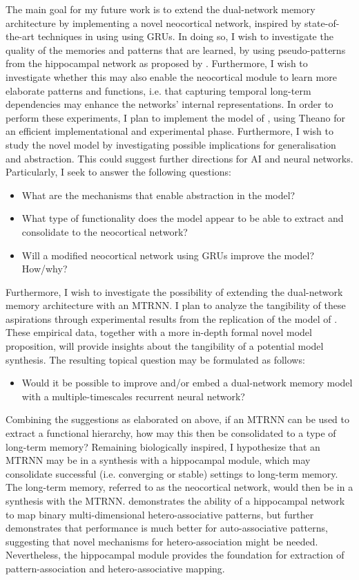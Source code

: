The main goal for my future work is to extend the dual-network memory architecture by implementing a novel neocortical network, inspired by state-of-the-art techniques in using using GRUs. In doing so, I wish to investigate the quality of the memories and patterns that are learned, by using pseudo-patterns from the hippocampal network as proposed by \cite{Hattori2014}. Furthermore, I wish to investigate whether this may also enable the neocortical module to learn more elaborate patterns and functions, i.e. that capturing temporal long-term dependencies may enhance the networks' internal representations.
In order to perform these experiments, I plan to implement the model of \cite{Hattori2014}, using Theano for an efficient implementational and experimental phase. Furthermore, I wish to study the novel model by investigating possible implications for generalisation and abstraction. This could suggest further directions for AI and neural networks. Particularly, I seek to answer the following questions:
\begin{itemize}
\item What are the mechanisms that enable abstraction in the model?
\item What type of functionality does the model appear to be able to extract and consolidate to the neocortical network?
\item Will a modified neocortical network using GRUs improve the model? How/why?
\end{itemize}

Furthermore, I wish to investigate the possibility of extending the dual-network memory architecture with an MTRNN. I plan to analyze the tangibility of these aspirations through experimental results from the replication of the model of \cite{Hattori2014}. These empirical data, together with a more in-depth formal novel model proposition, will provide insights about the tangibility of a potential model synthesis. The resulting topical question may be formulated as follows:
\begin{itemize}
\item Would it be possible to improve and/or embed a dual-network memory model with a multiple-timescales recurrent neural network?
\end{itemize}

Combining the suggestions as elaborated on above, if an MTRNN can be used to extract a functional hierarchy, how may this then be consolidated to a type of long-term memory? Remaining biologically inspired, I hypothesize that an MTRNN may be in a synthesis with a hippocampal module, which may consolidate successful (i.e. converging or stable) settings to long-term memory. The long-term memory, referred to as the neocortical network, would then be in a synthesis with the MTRNN.
\cite{Hattori2014} demonstrates the ability of a hippocampal network to map binary multi-dimensional hetero-associative patterns, but further demonstrates that performance is much better for auto-associative patterns, suggesting that novel mechanisms for hetero-association might be needed. Nevertheless, the hippocampal module provides the foundation for extraction of pattern-association and hetero-associative mapping.


